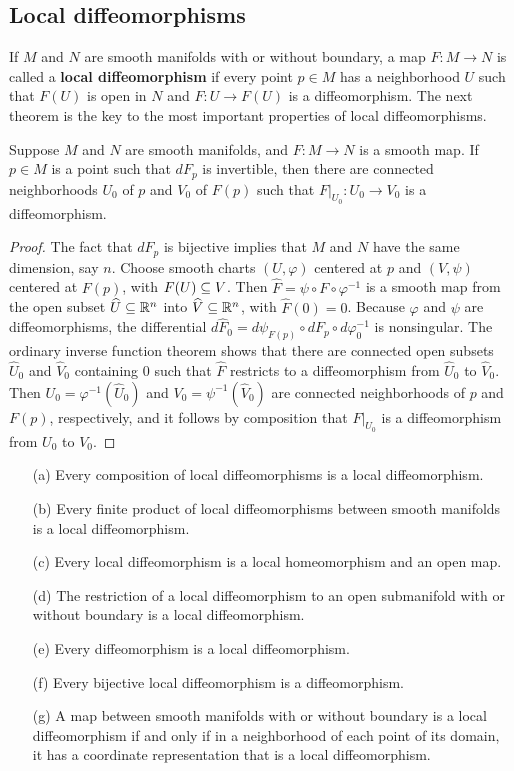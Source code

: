 \subsection{Local diffeomorphisms}
If $M$ and $N$ are smooth manifolds with or without boundary, a map $F:M\to N$ is called a \textbf{local diffeomorphism} if every point $p\in M$ has a neighborhood $U$ such that $F(U)$ is open in $N$ and $F:U\to F(U)$ is a diffeomorphism. The next theorem is the key to the most important properties of local diffeomorphisms.
\begin{theorem}
Suppose $M$ and $N$ are smooth manifolds, and $F:M\to N$ is a smooth map. If $p\in M$ is a point such that $dF_p$ is invertible, then there are connected neighborhoods $U_0$ of $p$ and $V_0$ of $F(p)$ such that $F|_{U_0}:U_0\to V_0$ is a diffeomorphism.
\end{theorem}
\begin{proof}
The fact that $dF_p$ is bijective implies that $M$ and $N$ have the same dimension, say $n$. Choose smooth charts $(U,\varphi)$ centered at $p$ and $(V,\psi)$ centered at $F(p)$, with $F(U)\subseteq V$. Then $\widehat{F}=\psi\circ F\circ\varphi^{-1}$ is a smooth map from the open subset $\widehat{U}\subseteq\mathbb{R}^n$ into $\widehat{V}\subseteq\mathbb{R}^n$, with $\widehat{F}(0)=0$. Because $\varphi$ and $\psi$ are diffeomorphisms, the differential $d\widehat{F}_0=d\psi_{F(p)}\circ dF_p\circ d\varphi^{-1}_0$ is nonsingular. The ordinary inverse function theorem shows that there are connected open subsets $\widehat{U}_0$ and $\widehat{V}_0$ containing $0$ such that $\widehat{F}$ restricts to a diffeomorphism from $\widehat{U}_0$ to $\widehat{V}_0$. Then $U_0=\varphi^{-1}(\widehat{U}_0)$ and $V_0=\psi^{-1}(\widehat{V}_0)$ are connected neighborhoods of $p$ and $F(p)$, respectively, and it follows by composition that $F|_{U_0}$ is a diffeomorphism from $U_0$ to $V_0$.
\end{proof}
\begin{proposition}\label{local diff prop}
\mbox{}
\begin{itemize}
\item[(a)] Every composition of local diffeomorphisms is a local diffeomorphism.
\item[(b)] Every finite product of local diffeomorphisms between smooth manifolds is a local diffeomorphism.
\item[(c)] Every local diffeomorphism is a local homeomorphism and an open map.
\item[(d)] The restriction of a local diffeomorphism to an open submanifold with or without boundary is a local diffeomorphism.
\item[(e)] Every diffeomorphism is a local diffeomorphism.
\item[(f)] Every bijective local diffeomorphism is a diffeomorphism.
\item[(g)] A map between smooth manifolds with or without boundary is a local diffeomorphism if and only if in a neighborhood of each point of its domain, it has a
coordinate representation that is a local diffeomorphism.
\end{itemize}
\end{proposition}
